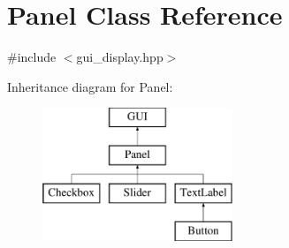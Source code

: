 \hypertarget{class_panel}{}\section{Panel Class Reference}
\label{class_panel}


{\ttfamily \#include $<$gui\+\_\+display.\+hpp$>$}

Inheritance diagram for Panel\+:\begin{figure}[H]
\begin{center}
\leavevmode
\includegraphics[height=4.000000cm]{class_panel}
\end{center}
\end{figure}
